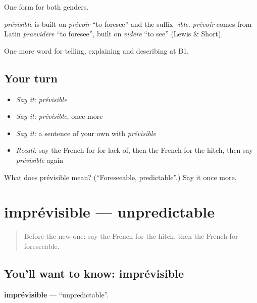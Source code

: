 One form for both genders.

\begin{cousinweb}
\emph{prévisible} is built on \emph{prévoir} \textquotedblleft{}to foresee\textquotedblright{} and the suffix \emph{-ible}. \emph{prévoir} comes from Latin \emph{praevidēre} \textquotedblleft{}to foresee\textquotedblright{}, built on \emph{vidēre} \textquotedblleft{}to see\textquotedblright{} (Lewis \& Short).
\end{cousinweb}

\begin{grammarlens}[title={What you've built}]
One more word for telling, explaining and describing at B1.
\end{grammarlens}

\subsection*{Your turn}
\begin{itemize}
\raggedright
  \item \emph{Say it:} \emph{prévisible}
  \item \emph{Say it:} \emph{prévisible}, once more
  \item \emph{Say it:} a sentence of your own with \emph{prévisible}
  \item \emph{Recall:} say the French for for lack of, then the French for the hitch, then say \emph{prévisible} again
\end{itemize}

\begin{tcolorbox}[breakable,colback=teal!4,colframe=teal!35!black,title={Before you move on}]
What does prévisible mean? (\textquotedblleft{}Foreseeable, predictable\textquotedblright{}.) Say it once more.
\end{tcolorbox}
\section[imprévisible]{imprévisible — unpredictable}

\label{lesson:FR-C370-imprevisible}



\begin{quote}
Before the new one: say the French for the hitch, then the French for foreseeable.
\end{quote}

\subsection*{You'll want to know: imprévisible}
\textbf{imprévisible} — \textquotedblleft{}unpredictable\textquotedblright{}.

